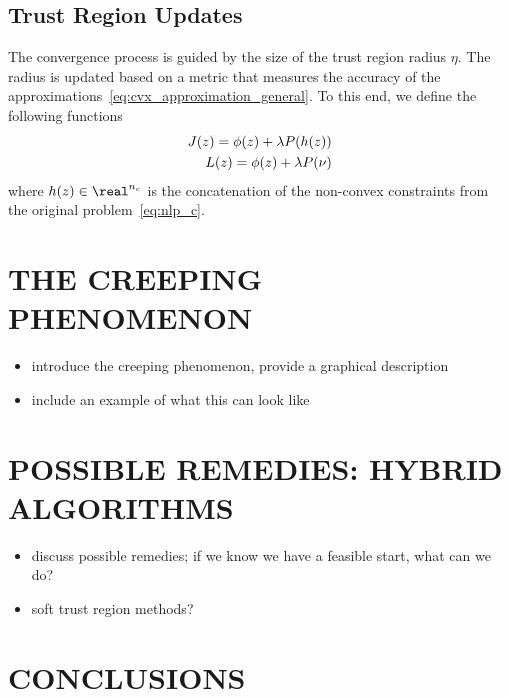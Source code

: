 \documentclass[letterpaper, 10 pt, conference]{ieeeconf}
\begin{document}
\subsection{Trust Region Updates}

The convergence process is guided by the size of the trust region radius $\eta$. The radius is updated based on a metric that measures the accuracy of the approximations~\eqref{eq:cvx_approximation_general}. To this end, we define the following functions
\begin{subequations}
\begin{align}
J(z) = \phi(z) + \lambda P(h(z)) \\
L(z) = \phi(z) + \lambda P(\nu)
\end{align}
\end{subequations}
where $h(\z) \in \real^{n_e}$ is the concatenation of the non-convex constraints from the original problem~\eqref{eq:nlp_c}.

\section{THE CREEPING PHENOMENON}

\begin{itemize}
\item introduce the creeping phenomenon, provide a graphical description
\item include an example of what this can look like
\end{itemize}


\section{POSSIBLE REMEDIES: HYBRID ALGORITHMS}

\begin{itemize}
\item discuss possible remedies; if we know we have a feasible start, what can we do?
\item soft trust region methods?
\end{itemize}

\section{CONCLUSIONS}


\end{document}
